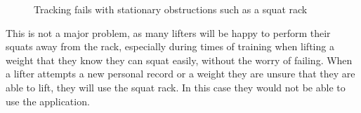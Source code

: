 \begin{figure}[H]
    \centering
\caption{Tracking fails with stationary obstructions such as a squat rack}
\label{fig:squatrack}
\end{figure}

This is not a major problem, as many lifters will be happy to perform their squats away from the rack, especially during times of training when lifting a weight that they know they can squat easily, without the worry of failing. When a lifter attempts a new personal record or a weight they are unsure that they are able to lift, they will use the squat rack. In this case they would not be able to use the application.

